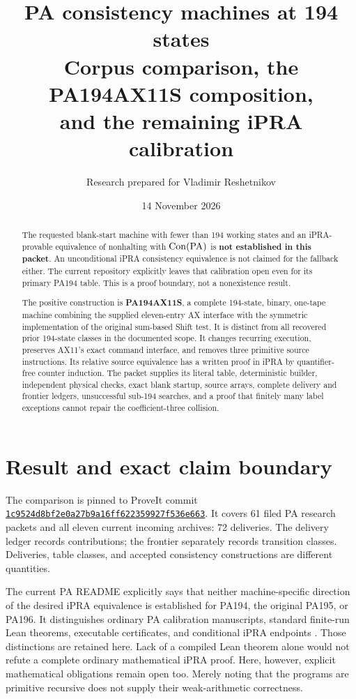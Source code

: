 \documentclass[11pt,letterpaper]{article}
\title{PA consistency machines at 194 states\\[0.4em]
\large Corpus comparison, the PA194AX11S composition,\\and the remaining iPRA calibration}
\author{Research prepared for Vladimir Reshetnikov}
\date{14 November 2026}
\newcommand{\Con}{\operatorname{Con}}\newcommand{\Halt}{\operatorname{Halt}}
\newcommand{\repo}{https://github.com/VladimirReshetnikov/ProveIt}
\newcommand{\pin}{1c9524d8bf2e0a27b9a16ff622359927f536e663}
\begin{document}
\maketitle
\begin{abstract}\noindent
The requested blank-start machine with fewer than 194 working states and
an iPRA-provable equivalence of nonhalting with $\Con(\PA)$ is
\textbf{not established in this packet}. An unconditional iPRA consistency
equivalence is not claimed for the fallback either. The current repository
explicitly leaves that calibration open even for its primary PA194 table.
This is a proof boundary, not a nonexistence result.

The positive construction is \textbf{PA194AX11S}, a complete 194-state,
binary, one-tape machine combining the supplied eleven-entry AX interface
with the symmetric implementation of the original sum-based Shift test.
It is distinct from all \FrontierCount{} recovered prior 194-state classes
in the documented scope. It changes recurring execution, preserves AX11's
exact command interface, and removes three primitive source instructions.
Its relative source equivalence has a written proof in iPRA by
quantifier-free counter induction. The packet supplies its literal table,
deterministic builder, independent physical checks, exact blank startup,
source arrays, complete delivery and frontier ledgers, unsuccessful
sub-194 searches, and a proof that finitely many label exceptions cannot
repair the coefficient-three collision.
\end{abstract}

\section{Result and exact claim boundary}
The comparison is pinned to ProveIt commit
\href{\repo/commit/\pin}{\texttt{1c9524d8bf2e0a27b9a16ff622359927f536e663}}.
It covers 61 filed PA research packets and all eleven current incoming
archives: 72 deliveries. The delivery ledger records contributions;
the frontier separately records transition classes. Deliveries, table
classes, and accepted consistency constructions are different quantities.

The current PA README explicitly says that neither machine-specific
direction of the desired iPRA equivalence is established for PA194, the
original PA195, or PA196. It distinguishes ordinary PA calibration
manuscripts, standard finite-run Lean theorems, executable certificates,
and conditional iPRA endpoints \cite{pa-status}. Those distinctions are
retained here. Lack of a compiled Lean theorem alone would not refute a
complete ordinary mathematical iPRA proof. Here, however, explicit
mathematical obligations remain open too. Merely noting that the programs
are primitive recursive does not supply their weak-arithmetic correctness.
\end{document}

